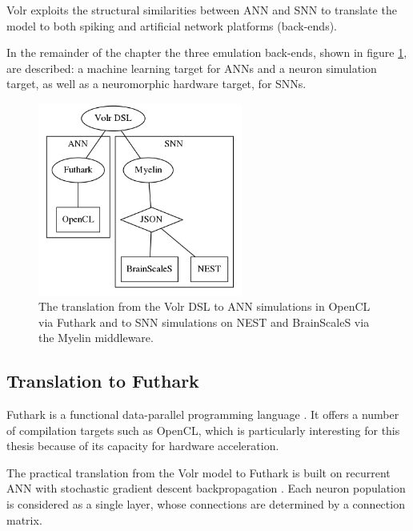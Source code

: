 \documentclass{report.tex}{subfiles}
\begin{document}

Volr exploits the structural similarities between \gls{ANN} and \gls{SNN} to
translate the model to both spiking and artificial network platforms (back-ends).

In the remainder of the chapter the three emulation back-ends, shown in figure
\ref{fig:volr}, are described:
a machine learning target for \gls{ANN}s and a neuron simulation target, as well
as a neuromorphic hardware target, for \gls{SNN}s.

\begin{figure}
  \centering
  \includegraphics[width=0.6\textwidth]{images/volr-architecture.png}
  \caption{The translation from the Volr DSL to \gls{ANN} simulations in OpenCL via
    \gls{Futhark} and to \gls{SNN} simulations on \gls{NEST} and \gls{BrainScaleS}
    via the \gls{Myelin} middleware.
  }
  \label{fig:volr}
\end{figure}

\subsection{Translation to Futhark} \label{sec:volr-futhark}
Futhark is a functional data-parallel programming language \autocite{Henriksen2017}.
It offers a number of compilation targets such as \gls{OpenCL}, which is
particularly interesting for this thesis because of its capacity for hardware
acceleration.

The practical translation from the Volr model to Futhark is built on recurrent
\gls{ANN} with stochastic gradient descent backpropagation
\autocite{russel2007, schmidhuber2014}.
Each neuron population is considered as a single layer, whose connections are
determined by a connection matrix.
\end{document}
